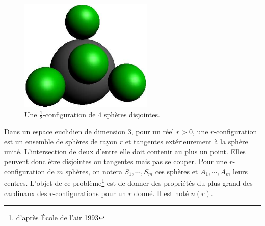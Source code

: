 \begin{figure}[h!t]
 \centering
 \includegraphics{./Esphertan_1.pdf}
 \caption{Une $\frac{1}{2}$-configuration de $4$ sphères disjointes.}
 \label{fig:Esphertan_1}
\end{figure}
Dans un espace euclidien de dimension $3$, pour un réel $r>0$, une $r$-configuration est un ensemble de sphères de rayon $r$ et tangentes extérieurement à la sphère unité. L'intersection de deux d'entre elle doit contenir au plus un point. Elles peuvent donc être disjointes ou tangentes mais pas se couper. Pour une $r$-configuration de $m$ sphères, on notera $S_1,\cdots,S_m$ ces sphères et $A_1,\cdots,A_m$ leurs centres.\newline
L'objet de ce problème\footnote{d'après \'Ecole de l'air 1993} est de donner des propriétés du plus grand des cardinaux des $r$-configurations pour un $r$ donné. Il est noté $n(r)$.

